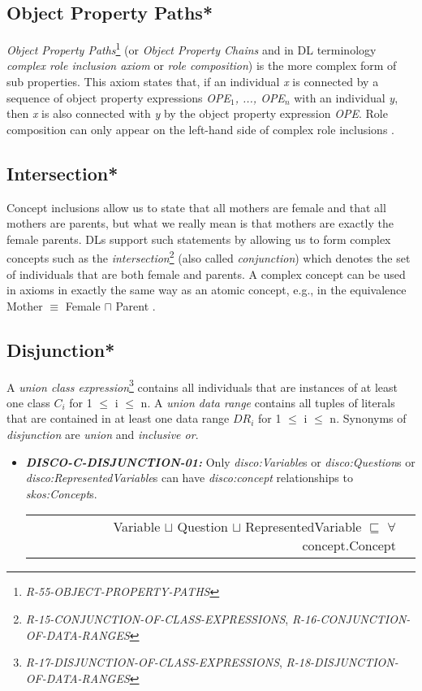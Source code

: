 \documentclass{llncs}
\newenvironment{DL}{
  \vspace{0cm}
  \begin{tabular}{r l}

}{
  \end{tabular}
}
\begin{document}
\subsection{Object Property Paths*}

\emph{Object Property Paths}\footnote{\emph{R-55-OBJECT-PROPERTY-PATHS}} (or \emph{Object Property Chains} and in DL terminology \emph{complex role inclusion axiom} or \emph{role composition}) is the more complex form of sub properties. 
This axiom states that, if an individual \emph{x} is connected by a sequence of object property expressions \emph{OPE$_1$, ..., OPE$_n$} with an individual \emph{y}, then \emph{x} is also connected with \emph{y} by the object property expression \emph{OPE}.  
Role composition can only appear on the left-hand side of complex role inclusions \cite{Kroetzsch2012}.

\subsection{Intersection*}

Concept inclusions allow us to state that all mothers are female and that
all mothers are parents, but what we really mean is that mothers are exactly the female
parents. DLs support such statements by allowing us to form complex concepts such as
the \emph{intersection}\footnote{\emph{R-15-CONJUNCTION-OF-CLASS-EXPRESSIONS}, \emph{R-16-CONJUNCTION-OF-DATA-RANGES}} (also called \emph{conjunction})
which denotes the set of individuals that are both female and parents. A complex concept
can be used in axioms in exactly the same way as an atomic concept, e.g., in the
equivalence Mother $\equiv$ Female $\sqcap$ Parent .

\subsection{Disjunction*}

A \emph{union class expression}\footnote{{\em R-17-DISJUNCTION-OF-CLASS-EXPRESSIONS}, {\em R-18-DISJUNCTION-OF-DATA-RANGES}} contains all individuals that are instances of at least one class $C_{i}$ for 1 $\leq$ i $\leq$ n. 
A \emph{union data range} contains all tuples of literals that are contained in at least one data range $DR_{i}$ for 1 $\leq$ i $\leq$ n.
Synonyms of {\em disjunction} are {\em union} and {\em inclusive or}.

\begin{itemize}
	\item \textbf{{\em DISCO-C-DISJUNCTION-01:}} 
Only {\em disco:Variable}s or {\em disco:Question}s or {\em disco:RepresentedVariable}s can have {\em disco:concept} relationships to {\em skos:Concept}s.

\begin{DL}
Variable $\sqcup$ Question $\sqcup$ RepresentedVariable $\sqsubseteq$ $\forall$ concept.Concept \\
\end{DL}
\end{itemize}
\end{document}
